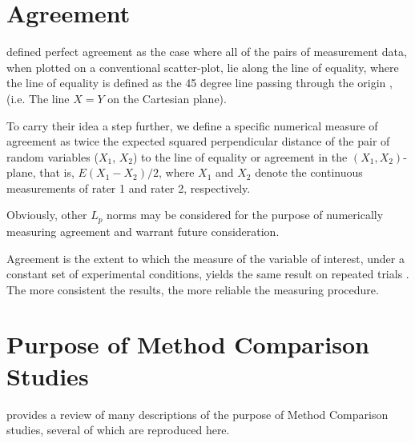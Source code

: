 \documentclass[12pt, a4paper]{report}
\theoremstyle{plain}
\theoremstyle{definition}
\theoremstyle{remark}
\begin{document}
	

	\section{Agreement}
	\citet{BA86} defined perfect agreement as the case where all of the pairs of measurement data, when plotted on a conventional scatter-plot, lie along the line of equality, where the line of equality is defined as the 45 degree line passing through the origin ,(i.e. The line $X=Y$ on the Cartesian plane). 
	
	To carry their idea a step further, we define a specific numerical measure of agreement as twice the expected squared perpendicular distance of the pair of random variables ($X_1$, $X_2$) to the line of equality or agreement in the $(X_1,X_2)$-plane, that is, $E(X_1 - X_2)/2$, where $X_1$ and $X_2$ denote the continuous measurements of rater 1 and rater 2, respectively.
	
	Obviously, other $L_p$ norms may be considered for the purpose of numerically measuring agreement and warrant future consideration. 
	
	
	Agreement is the extent to which the measure of the variable of interest, under a constant set of experimental conditions, yields the same result on repeated trials \citep{sanchez1999}. The more consistent the results, the more reliable the measuring procedure.
	




	\section{Purpose of Method Comparison Studies}
	\citet{BXC2010} provides a review of many descriptions of the purpose of Method Comparison studies, several of which are reproduced here.
	
\end{document}
